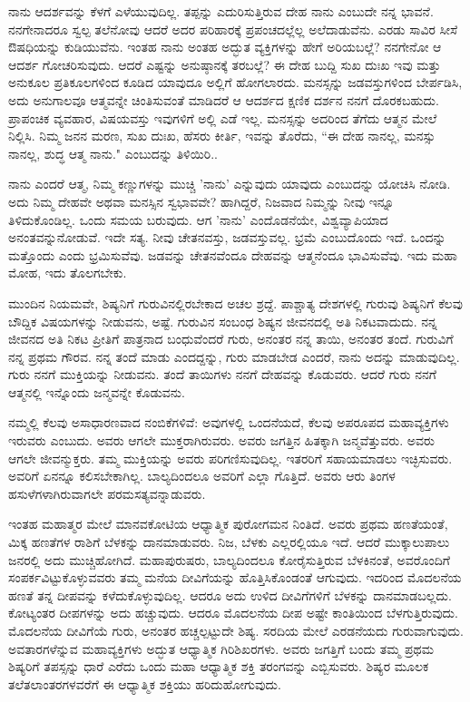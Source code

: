 ನಾನು ಆದರ್ಶವನ್ನು ಕೆಳಗೆ ಎಳೆಯುವುದಿಲ್ಲ. ತಪ್ಪನ್ನು ಎದುರಿಸುತ್ತಿರುವ ದೇಹ ನಾನು ಎಂಬುದೇ ನನ್ನ ಭಾವನೆ. ನನಗೇನಾದರೂ ಸ್ವಲ್ಪ ತಲೆನೋವು ಆದರೆ ಅದರ ಪರಿಹಾರಕ್ಕೆ ಪ್ರಪಂಚದಲ್ಲೆಲ್ಲ ಅಲೆದಾಡುವೆನು. ಎರಡು ಸಾವಿರ ಸೀಸೆ ಔಷಧಿಯನ್ನು ಕುಡಿಯುವೆನು. ಇಂತಹ ನಾನು ಅಂತಹ ಅದ್ಭುತ ವ್ಯಕ್ತಿಗಳನ್ನು ಹೇಗೆ ಅರಿಯಬಲ್ಲೆ? ನನಗೇನೋ ಆ ಆದರ್ಶ ಗೋಚರಿಸುವುದು. ಆದರೆ ಎಷ್ಟನ್ನು ಅನುಷ್ಠಾನಕ್ಕೆ ತರಬಲ್ಲೆ? ಈ ದೇಹ ಬುದ್ದಿ ಸುಖ ದುಃಖ ಇವು ಮತ್ತು ಅನುಕೂಲ ಪ್ರತಿಕೂಲಗಳಿಂದ ಕೂಡಿದ ಯಾವುದೂ ಅಲ್ಲಿಗೆ ಹೋಗಲಾರದು. ಮನಸ್ಸನ್ನು ಜಡವಸ್ತುಗಳಿಂದ ಬೇರ್ಪಡಿಸಿ, ಅದು ಅನುಗಾಲವೂ ಆತ್ಮವನ್ನೇ ಚಿಂತಿಸುವಂತೆ ಮಾಡಿದರೆ ಆ ಆದರ್ಶದ ಕ್ಷಣಿಕ ದರ್ಶನ ನನಗೆ ದೊರಕಬಹುದು. ಪ್ರಾಪಂಚಿಕ ವ್ಯವಹಾರ, ವಿಷಯವಸ್ತು ಇವುಗಳಿಗೆ ಅಲ್ಲಿ ಎಡೆ ಇಲ್ಲ. ಮನಸ್ಸನ್ನು ಅದರಿಂದ ತೆಗೆದು ಆತ್ಮನ ಮೇಲೆ ನಿಲ್ಲಿಸಿ. ನಿಮ್ಮ ಜನನ ಮರಣ, ಸುಖ ದುಃಖ, ಹೆಸರು ಕೀರ್ತಿ, ಇವನ್ನು ತೊರೆದು, “ಈ ದೇಹ ನಾನಲ್ಲ, ಮನಸ್ಸು ನಾನಲ್ಲ, ಶುದ್ಧ ಆತ್ಮ ನಾನು." ಎಂಬುದನ್ನು ತಿಳಿಯಿರಿ..

ನಾನು ಎಂದರೆ ಆತ್ಮ, ನಿಮ್ಮ ಕಣ್ಣುಗಳನ್ನು ಮುಚ್ಚಿ 'ನಾನು' ಎನ್ನುವುದು ಯಾವುದು ಎಂಬುದನ್ನು ಯೋಚಿಸಿ ನೋಡಿ. ಅದು ನಿಮ್ಮ ದೇಹವೇ ಅಥವಾ ಮನಸ್ಸಿನ ಸ್ವಭಾವವೇ? ಹಾಗಿದ್ದರೆ, ನಿಜವಾದ ನಿಮ್ಮನ್ನು ನೀವು ಇನ್ನೂ ತಿಳಿದುಕೊಂಡಿಲ್ಲ. ಒಂದು ಸಮಯ ಬರುವುದು. ಆಗ 'ನಾನು' ಎಂದೊಡನೆಯೇ, ವಿಶ್ವವ್ಯಾಪಿಯಾದ ಅನಂತವನ್ನು\break ನೋಡುವೆ. ಇದೇ ಸತ್ಯ. ನೀವು ಚೇತನವಸ್ತು, ಜಡವಸ್ತುವಲ್ಲ. ಭ್ರಮೆ ಎಂಬುದೊಂದು ಇದೆ. ಒಂದನ್ನು ಮತ್ತೊಂದು ಎಂದು ಭ್ರಮಿಸುವೆವು. ಜಡವನ್ನು ಚೇತನವೆಂದೂ ದೇಹವನ್ನು ಆತ್ಮನೆಂದೂ ಭಾವಿಸುವೆವು. ಇದು ಮಹಾ ಮೋಹ, ಇದು ತೊಲಗಬೇಕು.

ಮುಂದಿನ ನಿಯಮವೇ, ಶಿಷ್ಯನಿಗೆ ಗುರುವಿನಲ್ಲಿರಬೇಕಾದ ಅಚಲ ಶ್ರದ್ದೆ. ಪಾಶ್ಚಾತ್ಯ ದೇಶಗಳಲ್ಲಿ ಗುರುವು ಶಿಷ್ಯನಿಗೆ ಕೆಲವು ಬೌದ್ದಿಕ ವಿಷಯಗಳನ್ನು ನೀಡುವನು, ಅಷ್ಟೆ. ಗುರುವಿನ ಸಂಬಂಧ ಶಿಷ್ಯನ ಜೀವನದಲ್ಲಿ ಅತಿ ನಿಕಟವಾದುದು. ನನ್ನ ಜೀವನದ ಅತಿ ನಿಕಟ ಪ್ರೀತಿಗೆ ಪಾತ್ರನಾದ ಬಂಧುವೆಂದರೆ ಗುರು, ಅನಂತರ ನನ್ನ ತಾಯಿ, ಅನಂತರ ತಂದೆ. ಗುರುವಿಗೆ ನನ್ನ ಪ್ರಥಮ ಗೌರವ. ನನ್ನ ತಂದೆ ಮಾಡು ಎಂದದ್ದನ್ನು, ಗುರು ಮಾಡಬೇಡ ಎಂದರೆ, ನಾನು ಅದನ್ನು ಮಾಡುವುದಿಲ್ಲ. ಗುರು ನನಗೆ ಮುಕ್ತಿಯನ್ನು ನೀಡುವನು. ತಂದೆ ತಾಯಿಗಳು ನನಗೆ ದೇಹವನ್ನು ಕೊಡುವರು. ಆದರೆ ಗುರು ನನಗೆ ಆತ್ಮನಲ್ಲಿ ಇನ್ನೊಂದು ಜನ್ಮವನ್ನೇ ಕೊಡುವನು.

ನಮ್ಮಲ್ಲಿ ಕೆಲವು ಅಸಾಧಾರಣವಾದ ನಂಬಿಕೆಗಳಿವೆ: ಅವುಗಳಲ್ಲಿ ಒಂದನೆಯದೆ, ಕೆಲವು ಅಪರೂಪದ ಮಹಾವ್ಯಕ್ತಿಗಳು ಇರುವರು ಎಂಬುದು. ಅವರು ಆಗಲೇ ಮುಕ್ತರಾಗಿರುವರು. ಅವರು ಜಗತ್ತಿನ ಹಿತಕ್ಕಾಗಿ ಜನ್ಮವೆತ್ತುವರು. ಅವರು ಆಗಲೇ ಜೀವನ್ಮುಕ್ತರು. ತಮ್ಮ ಮುಕ್ತಿಯನ್ನು ಅವರು ಪರಿಗಣಿಸುವುದಿಲ್ಲ. ಇತರರಿಗೆ ಸಹಾಯಮಾಡಲು ಇಚ್ಛಿಸುವರು. ಅವರಿಗೆ ಏನನ್ನೂ ಕಲಿಸಬೇಕಾಗಿಲ್ಲ. ಬಾಲ್ಯದಿಂದಲೂ ಅವರಿಗೆ ಎಲ್ಲಾ ಗೊತ್ತಿದೆ. ಅವರು ಆರು ತಿಂಗಳ ಹಸುಳೆಗಳಾಗಿರುವಾಗಲೇ ಪರಮಸತ್ಯವನ್ನಾಡುವರು.

ಇಂತಹ ಮಹಾತ್ಮರ ಮೇಲೆ ಮಾನವಕೋಟಿಯ ಆಧ್ಯಾತ್ಮಿಕ ಪುರೋಗಮನ ನಿಂತಿದೆ. ಅವರು ಪ್ರಥಮ ಹಣತೆಯಂತೆ, ಮಿಕ್ಕ ಹಣತೆಗಳ ರಾಶಿಗೆ ಬೆಳಕನ್ನು ದಾನಮಾಡುವರು. ನಿಜ, ಬೆಳಕು ಎಲ್ಲರಲ್ಲಿಯೂ ಇದೆ. ಆದರೆ ಮುಕ್ಕಾಲುಪಾಲು ಜನರಲ್ಲಿ ಅದು ಮುಚ್ಚಿಹೋಗಿದೆ. ಮಹಾಪುರುಷರು, ಬಾಲ್ಯದಿಂದಲೂ ಕೋರೈಸುತ್ತಿರುವ ಬೆಳಕಿನಂತೆ, ಅವರೊಂದಿಗೆ ಸಂಪರ್ಕವಿಟ್ಟುಕೊಳ್ಳುವವರು ತಮ್ಮ ಮನೆಯ ದೀವಿಗೆಯನ್ನು ಹೊತ್ತಿಸಿಕೊಂಡಂತೆ ಆಗುವುದು. ಇದರಿಂದ ಮೊದಲನೆಯ ಹಣತೆ ತನ್ನ ದೀಪವನ್ನು ಕಳೆದುಕೊಳ್ಳುವುದಿಲ್ಲ. ಆದರೂ ಅದು ಉಳಿದ ದೀವಿಗೆಗಳಿಗೆ ಬೆಳಕನ್ನು ದಾನಮಾಡಬಲ್ಲದು. ಕೋಟ್ಯಂತರ ದೀಪಗಳನ್ನು ಅದು ಹಚ್ಚುವುದು. ಆದರೂ ಮೊದಲನೆಯ ದೀಪ ಅಷ್ಟೇ ಕಾಂತಿಯಿಂದ ಬೆಳಗುತ್ತಿರುವುದು. ಮೊದಲನೆಯ ದೀವಿಗೆಯೆ ಗುರು, ಅನಂತರ ಹಚ್ಚಲ್ಪಟ್ಟುದೇ ಶಿಷ್ಯ. ಸರದಿಯ ಮೇಲೆ ಎರಡನೆಯದು ಗುರುವಾಗುವುದು. ಅವತಾರಗಳೆನ್ನುವ ಮಹಾವ್ಯಕ್ತಿಗಳು ಅದ್ಭುತ ಆಧ್ಯಾತ್ಮಿಕ ಗಿರಿಶಿಖರಗಳು. ಅವರು ಜಗತ್ತಿಗೆ ಬಂದು ತಮ್ಮ ಪ್ರಥಮ ಶಿಷ್ಯರಿಗೆ ತಪಸ್ಸನ್ನು ಧಾರೆ ಎರೆದು ಒಂದು ಮಹಾ ಆಧ್ಯಾತ್ಮಿಕ ಶಕ್ತಿ ತರಂಗವನ್ನು ಎಬ್ಬಿಸುವರು. ಶಿಷ್ಯರ ಮೂಲಕ ತಲೆತಲಾಂತರಗಳವರೆಗೆ ಈ ಆಧ್ಯಾತ್ಮಿಕ ಶಕ್ತಿಯು ಹರಿದುಹೋಗುವುದು.

